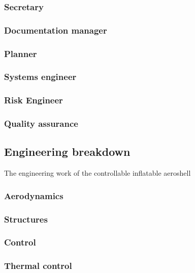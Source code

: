 \subsubsection{Secretary}\label{subsec:Secretary}


\subsubsection{Documentation manager}\label{subsec:D_and_A}


\subsubsection{Planner}\label{subsec:Planner}


\subsubsection{Systems engineer}\label{subsec:SE}


\subsubsection{Risk Engineer}\label{subsec:RiskEng}


\subsubsection{Quality assurance}\label{subsec:QA}


\subsection{Engineering breakdown}\label{subsec:engineer}
The engineering work of the controllable inflatable aeroshell 

\subsubsection{Aerodynamics}\label{subsec:aero}

\subsubsection{Structures}\label{subsec:struct}

\subsubsection{Control}\label{subsec:control}

\subsubsection{Thermal control}\label{subsec:therm}
